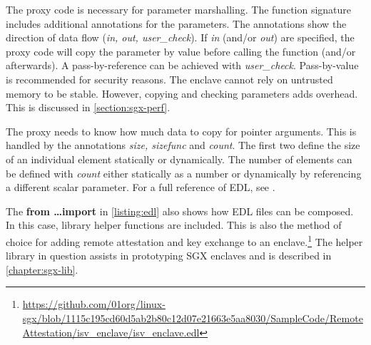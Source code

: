 The proxy code is necessary for parameter marshalling.\label{ID_930140065}
The function signature includes additional annotations for the parameters.\label{ID_1680143487}
The annotations show the direction of data flow (\textit{in, out, user\_{}check}).\label{ID_1178777303}
If \textit{in} (and/or \textit{out}) are specified, the proxy code will copy the parameter by value before calling the function (and/or afterwards). A pass-by-reference can be achieved with \textit{user\_{}check}.\label{ID_77293385}
Pass-by-value is recommended for security reasons. The enclave cannot rely on untrusted memory to be stable. However, copying and checking parameters adds overhead. This is discussed in \autoref{section:sgx-perf}.\label{ID_1962499209}


The proxy needs to know how much data to copy for pointer arguments. This is handled by the annotations \textit{size, sizefunc} and \textit{count}. The first two define the size of an individual element statically or dynamically. The number of elements can be defined with \textit{count} either statically as a number or dynamically by referencing a different scalar parameter.\label{ID_1101116303}
For a full reference of EDL, see \cite{sgx-windows}.\label{ID_294430690}

The \textbf{from \ldots import} in \autoref{listing:edl} also shows how EDL files can be composed. In this case, library helper functions are included.\label{ID_1465748199}
This is also the method of choice for adding remote attestation and key exchange to an enclave.\footnote{\url{https://github.com/01org/linux-sgx/blob/1115c195cd60d5ab2b80c12d07e21663e5aa8030/SampleCode/RemoteAttestation/isv_enclave/isv_enclave.edl}}\label{ID_1804743643}
The helper library in question assists in prototyping SGX enclaves and is described in \autoref{chapter:sgx-lib}.\label{ID_597042526}

